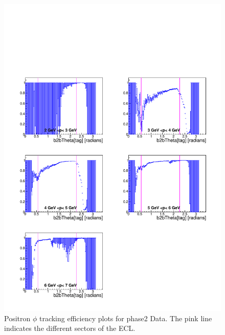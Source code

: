 \documentclass[a4paper,11pt,twosided,final,german,openbib,pdftex,listof=totoc,bibliography=totoc]{scrbook}
\begin{document}
\begin{appendix}
\begin{figure}[!htbp]
	\centering
	\includegraphics[width=\textwidth]{Plots/master/xPMThetaep_Data}
	\caption[Momentum $\theta$ Positron Efficiency Phase2 Data]{Positron $\phi$ tracking efficiency plots for phase2 Data. The pink line indicates the different sectors of the ECL.}
	\label{plt:PMThetaep_Data}
\end{figure}



\end{appendix}
\end{document}
